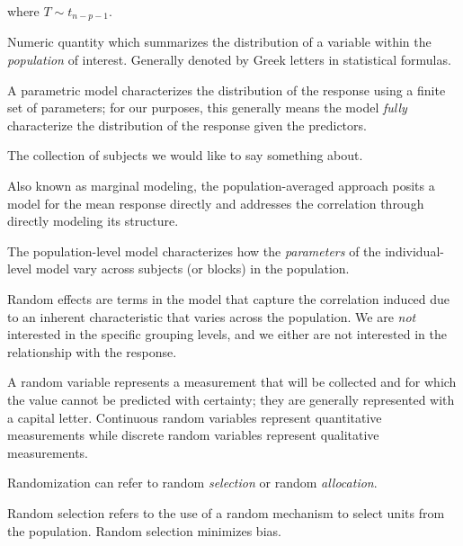 \documentclass[
  letterpaper,
  DIV=11,
  numbers=noendperiod]{scrreprt}
\providecommand{\tightlist}{%
  \setlength{\itemsep}{0pt}\setlength{\parskip}{0pt}}\usepackage{longtable,booktabs,array}
\theoremstyle{definition}
\theoremstyle{definition}
\theoremstyle{remark}
\begin{document}
where \(T \sim t_{n-p-1}\).

\begin{description}
\tightlist
\item[Parameter (Definition~\ref{def-parameter})]
Numeric quantity which summarizes the distribution of a variable within
the \emph{population} of interest. Generally denoted by Greek letters in
statistical formulas.
\item[Parametric Model (Definition~\ref{def-parametric-model})]
A parametric model characterizes the distribution of the response using
a finite set of parameters; for our purposes, this generally means the
model \emph{fully} characterize the distribution of the response given
the predictors.
\item[Population (Definition~\ref{def-population})]
The collection of subjects we would like to say something about.
\item[Population Averaged Models
(Definition~\ref{def-population-averaged})]
Also known as marginal modeling, the population-averaged approach posits
a model for the mean response directly and addresses the correlation
through directly modeling its structure.
\item[Population-Level Model (Definition~\ref{def-population-model})]
The population-level model characterizes how the \emph{parameters} of
the individual-level model vary across subjects (or blocks) in the
population.
\item[Random Effect (Definition~\ref{def-random-effect})]
Random effects are terms in the model that capture the correlation
induced due to an inherent characteristic that varies across the
population. We are \emph{not} interested in the specific grouping
levels, and we either are not interested in the relationship with the
response.
\item[Random Variable (Definition~\ref{def-random-variable})]
A random variable represents a measurement that will be collected and
for which the value cannot be predicted with certainty; they are
generally represented with a capital letter. Continuous random variables
represent quantitative measurements while discrete random variables
represent qualitative measurements.
\item[Randomization (Definition~\ref{def-randomization})]
Randomization can refer to random \emph{selection} or random
\emph{allocation}.
\end{description}

Random selection refers to the use of a random mechanism to select units
from the population. Random selection minimizes bias.
\end{document}
